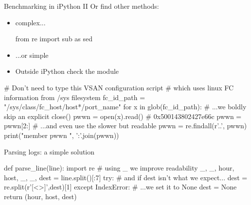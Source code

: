 \begin{pyframe}{Benchmarking in iPython II}
Or find other methods:
\begin{itemize}
\item complex...
\begin{pycode}
from re import sub as sed
\end{pycode}
\item ...or simple
\begin{pycode}
\end{pycode}
\item Outside iPython check the  module
\end{itemize}
\end{pyframe}

%

\begin{pyframe}{}
\begin{pycode}
# Don't need to type this VSAN configuration script
#  which uses linux FC information from /sys filesystem
fc_id_path = "/sys/class/fc_host/host*/port_name"
for x in glob(fc_id_path):
    # ...we boldly skip an explicit close()
    pwwn = open(x).read()  # 0x500143802427e66c
    pwwn = pwwn[2:]
    # ...and even use the slower but readable
    pwwn = re.findall(r'..', pwwn)
    print("member pwwn ", ':'.join(pwwn))

\end{pycode}
\end{pyframe}

\begin{pyframe}{Parsing logs: a simple solution}
\begin{pycode}
def parse_line(line):
    import re
    # using _ we improve readability
    _, _, hour, host, _, _, dest = line.split()[:7]
    try:
        # and if dest isn't what we expect...
        dest = re.split(r'[<>]',dest)[1]
    except IndexError:
        # ...we set it to None
        dest = None
    return (hour, host, dest)
\end{pycode}
\end{pyframe}
